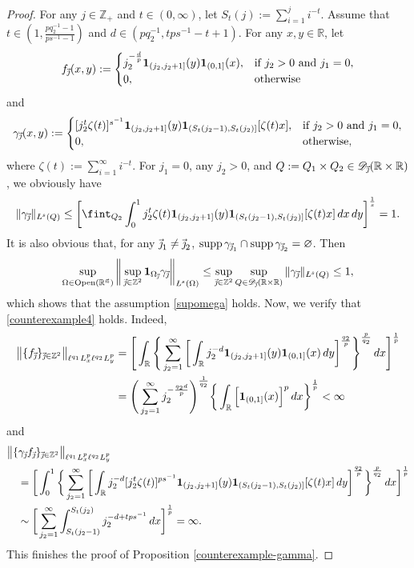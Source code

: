 \documentclass[11pt, reqno]{amsart}
\theoremstyle{definition}
\theoremstyle{remark}
\numberwithin{equation}{section}
\newcommand{\R}{\mathbb R}
\newcommand{\Z}{\mathbb Z}
\newcommand{\vj}{\vec{\textit{\j}}}
\newcommand{\vn}{\vec n}
\newcommand{\one}{\mathbf{1}}
\newcommand{\aveL}{\textit{\L}}
\newcommand{\bNorm}[2]{\big\|#1\big\|_{#2}}
\newcommand{\Open}{\mathrm{Open}}
\begin{document}
\begin{proof}
For any $j\in\Z_+$ and $t\in(0,\infty)$,
let $S_t(j):=\sum_{i=1}^ji^{-t}$.
Assume that $t\in(1,\frac{pq_2^{-1}-1}{ps^{-1}-1})$
and $d\in(pq_2^{-1},tps^{-1}-t+1)$.
For any $x,y\in\mathbb R$, let
\begin{align*}
f_{\vj}(x,y):=\begin{cases}
j_{2}^{-\frac dp}
\mathbf1_{(j_2,j_2+1]}(y)
\mathbf{1}_{(0,1]}(x),
&\text{if } j_2>0\text{ and }
j_1=0,\\
0,&\text{otherwise}
\end{cases}
\end{align*}
and
\begin{align*}
\gamma_{\vj}(x,y):=\begin{cases}
[j_2^{t}\zeta(t)]^{s^{-1}}\mathbf1_{(j_2,j_2+1]}(y)
\mathbf{1}_{(S_t(j_2-1),S_t(j_2)]}[\zeta(t)x],
&\text{if } j_2>0\text{ and }
j_1=0,\\
0,&\text{otherwise},
\end{cases}
\end{align*}
where $\zeta(t):=\sum_{i=1}^\infty i^{-t}$.
For $j_1=0$, any $j_2>0$, and $Q:=Q_1\times Q_2\in\mathscr D_{\vj}(\mathbb R\times\mathbb R)$,
we obviously have
\begin{align*}
\|\gamma_{\vj}\|_{\aveL^s(Q)}\le\bigg[\fint_{Q_2}\int_{0}^1j_2^{t}\zeta(t)\mathbf1_{(j_2,j_2+1]}(y)
\mathbf{1}_{(S_t(j_2-1),S_t(j_2)]}[\zeta(t)x]\,dx\,dy\bigg]^{\frac1s}=1.
\end{align*}
It is also obvious that, for any $\vj_1\neq\vj_2$,
$\operatorname{supp}\gamma_{\vj_1}\cap\operatorname{supp}\gamma_{\vj_2}=\varnothing$.
Then
$$\sup_{\Omega\in\Open(\R^{\vn})}\bigg\|\sup_{\vj\in\mathbb Z^2}
\one_{\Omega_{\vj}} \gamma_{\vj} \bigg\|_{\aveL^s(\Omega)}\le
\sup_{\vj\in\Z^2}\sup_{Q\in\mathscr D_{\vj}(\mathbb R\times\mathbb R)}
\|\gamma_{\vj}\|_{\aveL^s(Q)}\le1,
$$
which shows that the assumption \eqref{supomega} holds.
Now, we verify that \eqref{counterexample4} holds.
Indeed,
\begin{align*}
\bNorm{\{ f_{\vj}\}_{\vj\in\Z^2}}
{\ell^{q_1}L_x^{p}\ell^{q_2}L_y^p}
&=\Bigg[\int_{\mathbb R}\Bigg\{\sum_{j_2=1}^\infty\bigg[\int_{\mathbb R}j_{2}^{-d}
\mathbf1_{(j_2,j_2+1]}(y)
\mathbf{1}_{(0,1]}(x)\,dy\bigg]^{\frac{q_2}p}\Bigg\}^{\frac p{q_2}}
\,dx\Bigg]^{\frac1p}\\
&=\Bigg(\sum_{j_2=1}^\infty j_2^{-\frac{q_2d}p}\Bigg)^{\frac1{q_2}}
\bigg\{\int_{\mathbb R}\Big[\mathbf1_{(0,1]}(x)\Big]^p\,dx\bigg\}^{\frac1p}<\infty
\end{align*}
and
\begin{align*}
&\bNorm{\{\gamma_{\vj}f_{\vj}\}_{\vj\in\Z^2}}{\ell^{q_1}L_x^{p}\ell^{q_2}L_y^p}\\
&\quad=\bigg[\int_0^1\bigg\{\sum_{j_2=1}^\infty\bigg[\int_{\mathbb R} j_2^{-d}
[j_2^{t}\zeta(t)]^{ps^{-1}}\mathbf1_{(j_2,j_2+1]}(y)
\mathbf{1}_{(S_t(j_2-1),S_t(j_2)]}[\zeta(t)x]\,dy
\bigg]^{\frac{q_2}p}\bigg\}^{\frac{p}{q_2}}\,dx\bigg]^{\frac1p}\\
&\quad\sim\bigg[\sum_{j_2=1}^\infty\int_{S_t(j_2-1)}^{S_t(j_2)}
j_2^{-d+tps^{-1}}\,dx\bigg]^{\frac 1p}=\infty.
\end{align*}
This finishes the proof of Proposition \ref{counterexample-gamma}.
\end{proof}
\end{document}
